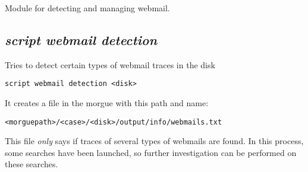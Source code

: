 \documentclass[a4paper,11pt,oneside]{report}
\begin{document}
Module for detecting and managing webmail.

\subsection{\emph{script webmail detection}} 

Tries to detect certain types of webmail traces in the disk

\begin{verbatim}
script webmail detection <disk>
\end{verbatim}

It creates a file in the morgue with this path and name:

\begin{verbatim}
<morguepath>/<case>/<disk>/output/info/webmails.txt
\end{verbatim}

This file \emph{only} says if traces of several types of webmails are found. In this process, some searches have been launched, so further investigation can be performed on these searches.
\end{document}
